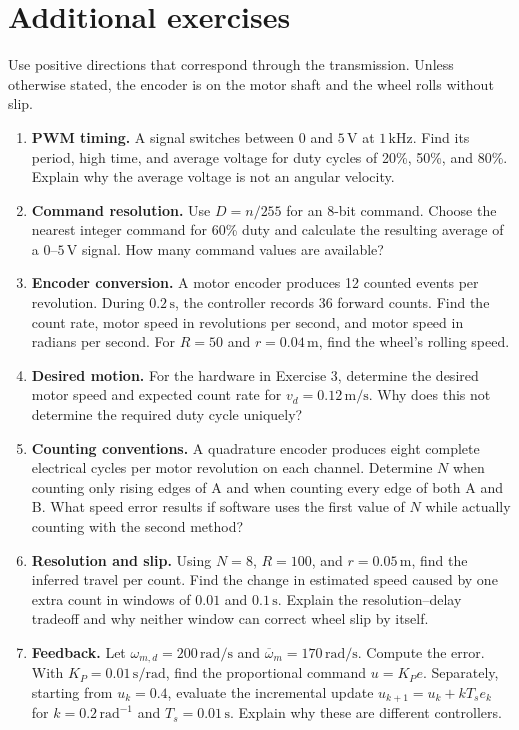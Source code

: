\section{Additional exercises}
Use positive directions that correspond through the transmission. Unless
otherwise stated, the encoder is on the motor shaft and the wheel rolls
without slip.
\begin{enumerate}
\item \textbf{PWM timing.} A signal switches between 0 and $5\,\mathrm V$
at $1\,\mathrm{kHz}$. Find its period, high time, and average voltage for
duty cycles of 20\%, 50\%, and 80\%. Explain why the average voltage is
not an angular velocity.

\item \textbf{Command resolution.} Use $D=n/255$ for an 8-bit command.
Choose the nearest integer command for 60\% duty and calculate the resulting
average of a 0--$5\,\mathrm V$ signal. How many command values are available?

\item \textbf{Encoder conversion.} A motor encoder produces 12 counted
events per revolution. During $0.2\,\mathrm s$, the controller records 36
forward counts. Find the count rate, motor speed in revolutions per second,
and motor speed in radians per second. For $R=50$ and $r=0.04\,\mathrm m$,
find the wheel's rolling speed.

\item \textbf{Desired motion.} For the hardware in Exercise 3, determine
the desired motor speed and expected count rate for $v_d=0.12\,\mathrm{m/s}$.
Why does this not determine the required duty cycle uniquely?

\item \textbf{Counting conventions.} A quadrature encoder produces eight
complete electrical cycles per motor revolution on each channel. Determine
$N$ when counting only rising edges of A and when counting every edge of
both A and B. What speed error results if software uses the first value of
$N$ while actually counting with the second method?

\item \textbf{Resolution and slip.} Using $N=8$, $R=100$, and
$r=0.05\,\mathrm m$, find the inferred travel per count. Find the change
in estimated speed caused by one extra count in windows of $0.01$ and
$0.1\,\mathrm s$. Explain the resolution--delay tradeoff and why neither
window can correct wheel slip by itself.

\item \textbf{Feedback.} Let $\omega_{m,d}=200\,\mathrm{rad/s}$ and
$\overline\omega_m=170\,\mathrm{rad/s}$. Compute the error. With
$K_P=0.01\,\mathrm{s/rad}$, find the proportional command $u=K_Pe$.
Separately, starting from $u_k=0.4$, evaluate the incremental update
$u_{k+1}=u_k+kT_s e_k$ for $k=0.2\,\mathrm{rad}^{-1}$ and
$T_s=0.01\,\mathrm s$. Explain why these are different controllers.
\end{enumerate}
